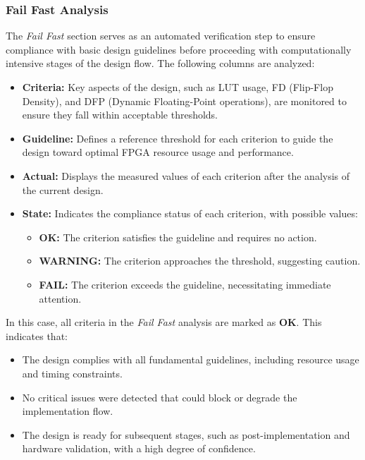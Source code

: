 \documentclass{article}
\begin{document}
\subsubsection{Fail Fast Analysis}

The \textit{Fail Fast} section serves as an automated verification step to ensure compliance with basic design guidelines before proceeding with computationally intensive stages of the design flow. The following columns are analyzed:

\begin{itemize}
    \item \textbf{Criteria:} Key aspects of the design, such as LUT usage, FD (Flip-Flop Density), and DFP (Dynamic Floating-Point operations), are monitored to ensure they fall within acceptable thresholds.
    \item \textbf{Guideline:} Defines a reference threshold for each criterion to guide the design toward optimal FPGA resource usage and performance.
    \item \textbf{Actual:} Displays the measured values of each criterion after the analysis of the current design.
    \item \textbf{State:} Indicates the compliance status of each criterion, with possible values:
    \begin{itemize}
        \item \textbf{OK:} The criterion satisfies the guideline and requires no action.
        \item \textbf{WARNING:} The criterion approaches the threshold, suggesting caution.
        \item \textbf{FAIL:} The criterion exceeds the guideline, necessitating immediate attention.
    \end{itemize}
\end{itemize}

In this case, all criteria in the \textit{Fail Fast} analysis are marked as \textbf{OK}. This indicates that:
\begin{itemize}
    \item The design complies with all fundamental guidelines, including resource usage and timing constraints.
    \item No critical issues were detected that could block or degrade the implementation flow.
    \item The design is ready for subsequent stages, such as post-implementation and hardware validation, with a high degree of confidence.
\end{itemize}
\end{document}
